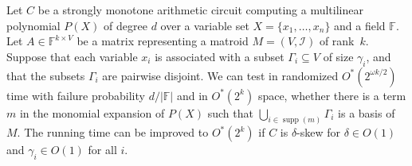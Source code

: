 \documentclass{theoretics}
\newcommand{\F}{\ensuremath{\mathbb F}\xspace}
\newcommand{\cI}{\ensuremath{\mathcal I}\xspace}
\DeclareMathOperator{\supp}{supp}
\begin{document}
\begin{theorem} \label{lemma:simple-matroid-sieving}
  Let $C$ be a strongly monotone arithmetic circuit computing a multilinear polynomial $P(X)$ of degree $d$ over a variable set $X=\{x_1,\ldots,x_n\}$ and a field $\F$.
  Let $A \in \F^{k \times V}$ be a matrix representing a matroid $M=(V, \cI)$ of rank~$k$. 
  Suppose that each variable $x_i$ is associated with a subset $\Gamma_i \subseteq V$ of size $\gamma_i$, and that the subsets $\Gamma_i$ are pairwise disjoint.
  We can test in randomized $O^*(2^{\omega k / 2})$ time with failure probability $d / |\F|$ and in $O^*(2^k)$ space, whether there is a term $m$ in the monomial expansion of $P(X)$ such that $\bigcup_{i \in \supp(m)} \Gamma_i$ is a basis of $M$.
  The running time can be improved to $O^*(2^{k})$ if $C$ is $\delta$-skew for $\delta \in O(1)$ and $\gamma_i \in O(1)$ for all $i$.
\end{theorem}
\end{document}
